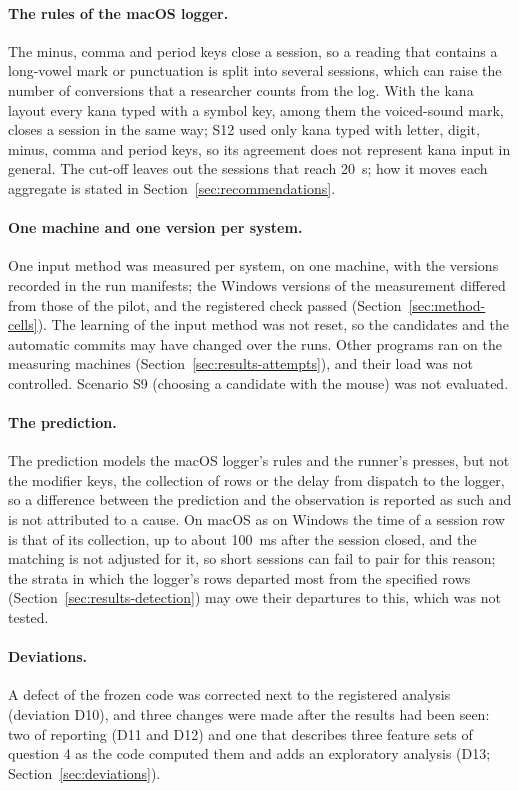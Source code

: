 \paragraph{The rules of the macOS logger.} The minus, comma and period keys close a session, so a reading that contains
a long-vowel mark or punctuation is split into several sessions, which can raise the number of conversions that a
researcher counts from the log. With the kana layout every kana typed with a symbol key, among them the voiced-sound
mark, closes a session in the same way; S12 used only kana typed with letter, digit, minus, comma and period keys, so
its agreement does not represent kana input in general. The cut-off leaves out
the sessions that reach 20~s; how it moves each aggregate is stated in Section~\ref{sec:recommendations}.

\paragraph{One machine and one version per system.} One input method was measured per system, on one machine, with the
versions recorded in the run manifests; the Windows versions of the measurement differed from those of the pilot, and
the registered check passed (Section~\ref{sec:method-cells}). The learning of the input method was not reset, so the
candidates and the automatic commits may have changed over the runs. Other programs ran on the measuring machines
(Section~\ref{sec:results-attempts}), and their load was not controlled. Scenario S9 (choosing a candidate with the
mouse) was not evaluated.

\paragraph{The prediction.} The prediction models the macOS logger's rules and the runner's presses, but not the
modifier keys, the collection of rows or the delay from dispatch to the logger, so a difference between the prediction
and the observation is reported as such and is not attributed to a cause. On macOS as on Windows the time of a session
row is that of its collection, up to about 100~ms after the session closed, and the matching is not adjusted for it, so
short sessions can fail to pair for this reason; the strata in which the logger's rows departed most from the specified
rows (Section~\ref{sec:results-detection}) may owe their departures to this, which was not tested.

\paragraph{Deviations.} A defect of the frozen code was corrected next to the registered analysis (deviation D10), and
three changes were made after the results had been seen: two of reporting (D11 and D12) and one that describes three
feature sets of question 4 as the code computed them and adds an exploratory analysis (D13;
Section~\ref{sec:deviations}).

